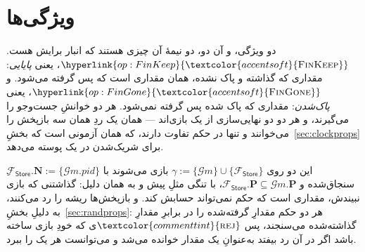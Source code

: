 \documentclass[10pt,oneside,openany]{book}
\newcommand{\Ps}{\mathbf{P}}
\newcommand{\PID}{\mathit{pid}}
\newcommand{\admits}{\mathbf{N}}
\newcommand{\op}[1]{\textnormal{\textsc{#1}}}
\newcommand{\opl}[1]{\hyperlink{op:#1}{\textcolor{accentsoft}{\op{#1}}}}
\newcommand{\atom}[1]{\textcolor{commenttint}{\op{#1}}}
\newcommand{\rej}{\atom{rej}}
\newcommand{\Gm}{\mathcal{G}m}
\newcommand{\Fstore}{\mathcal{F}_{\mathsf{Store}}}
\theoremstyle{accentdef}
\theoremstyle{accentplain}
\begin{document}
\section{ویژگی‌ها}\label{sec:storeprops}

دو ویژگی، و آن دو، دو نیمهٔ آن چیزی هستند که انبار برایش هست.
$\opl{FinKeep}$، یعنی \emph{پایایی}: مقداری که گذاشته و پاک نشده، همان
مقداری است که پس گرفته می‌شود. و $\opl{FinGone}$، یعنی \emph{پاک‌شدن}:
مقداری که پاک شده پس گرفته نمی‌شود. هر دو خوانشِ جست‌وجو را می‌گیرند، و هر
دو دو نهایی‌سازی از یک بازی‌اند --- همان یک ردِ همان سه بازپخش را می‌خوانند و
تنها در حکم تفاوت دارند، که همان آزمونی است که
بخشِ~\ref{sec:clockprops} برای شریک‌شدن در یک پوسته می‌دهد.

این دو روی $\gamma := \{\Gm\} \cup \{\Fstore\}$ بازی می‌شوند با
$\Fstore.\admits := \{\Gm.\PID\}$ِ سنجاق‌شده و $\Fstore.\Ps \subseteq
\Gm.\Ps$، با تنگی مثلِ پیش و به همان دلیل: گذاشتنی که بازی نبیندش، مقداری است
که حکم نمی‌تواند حسابش کند. و بازپخش‌ها ریشه را رد می‌کنند، به دلیلِ
بخشِ~\ref{sec:randprops}: هر دو حکم مقدارِ گرفته‌شده را در برابرِ مقدارِ
گذاشته‌شده می‌سنجند، پس $\rej$ی که خودِ بازی ساخته باشد اگر در آن رد بیفتد
به‌عنوانِ یک مقدار خوانده می‌شد و می‌توانست هر یک را ببرد.
\end{document}
